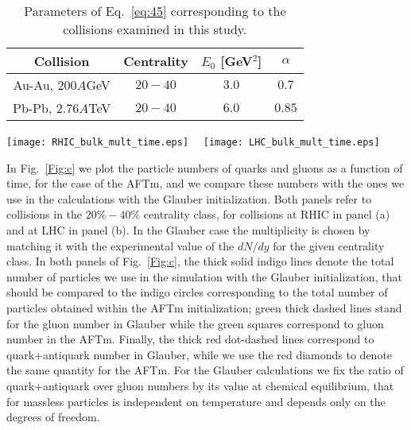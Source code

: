 \documentclass[aps,prc,a4paper,nofootinbib,
preprintnumbers,superscriptaddress,twocolumn,showpacs,showkeys]{revtex4}
\begin{document}
\begin{table}[t!]
\begin{tabular}{|c|c|c|c|}\hline
{\bf Collision}&{\bf Centrality}&$E_0$ [GeV$^2$]&$\alpha$\\
\hline
Au-Au, $200 A$GeV&$20-40$&$3.0$&$0.7$\\
\hline
Pb-Pb, $2.76 A$TeV&$20-40$&$6.0$&$0.85$\\
\hline
\end{tabular}
\caption{
\label{Tab:1}Parameters of Eq.~\eqref{eq:45} corresponding to the collisions examined in this study.}
\end{table}


 

 

\begin{figure*}[t!]
\begin{center}
\texttt{[image: RHIC\_bulk\_mult\_time.eps]}~~
\texttt{[image: LHC\_bulk\_mult\_time.eps]}
\caption{\label{Fig:c}Quark, gluon and total particle numbers for the AFTm initialization, compared with the
values used in the Glauber initialization. Panel {\bf (a)} corresponds to a collision at the RHIC energy
while panel {\bf (b)} stands for a collision at the LHC energy. 
Squares, diamonds and circles correspond to gluons, quarks and total particle number of the AFTm.
Both panels refer to collisions
belonging to the $20\%-40\%$ centrality class. }
\end{center}
\end{figure*}

In Fig.~\ref{Fig:c} we plot the particle numbers of quarks and gluons as a function of time, for the case of the
AFTm, and we compare these numbers with the ones we use in the calculations with the Glauber initialization.
Both panels refer to collisions in the $20\%-40\%$
centrality class, for collisions at RHIC in panel (a) and at LHC in panel (b).
In the Glauber case the multiplicity is chosen by matching it with the experimental
value of the $dN/dy$ for the given centrality class.
In both panels of Fig.~\ref{Fig:c}, the thick solid indigo lines denote the total number of particles we use in 
the simulation with the Glauber initialization, that should be compared to the
indigo  circles corresponding to the total number
of particles obtained within the AFTm initialization;  green thick dashed lines stand for the gluon number in Glauber
while the green squares correspond to gluon number in the AFTm. Finally, the thick red dot-dashed lines
correspond to quark+antiquark number in Glauber, while we use the red diamonds to
denote the same quantity for the AFTm. For the Glauber calculations we fix the ratio of quark+antiquark over
gluon numbers by its value at chemical equilibrium, that for massless particles is independent on temperature and depends
only on the degrees of freedom. 
\end{document}
